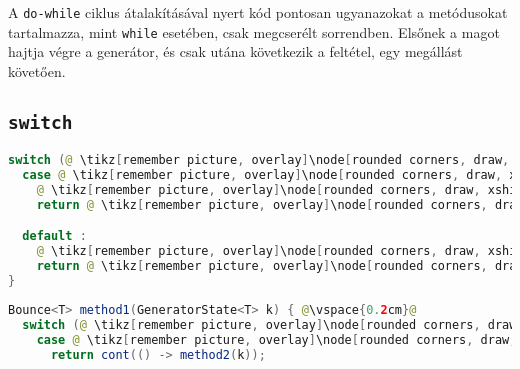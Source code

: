 A \texttt{do-while} ciklus átalakításával nyert kód pontosan ugyanazokat a metódusokat tartalmazza, mint \texttt{while} esetében, csak megcserélt sorrendben. Elsőnek a magot hajtja végre a generátor, és csak utána következik a feltétel, egy megállást követően.

\subsection{\texttt{switch}}

\begin{center}
\begin{mdframed}[topline=true]
\begin{minipage}[t]{0.4\textwidth}
\begin{lstlisting}[language=Java, numbers=none, breaklines=true]
switch (@ \tikz[remember picture, overlay]\node[rounded corners, draw, xshift=-0.1cm, inner sep=5pt, anchor=west, yshift=0.1cm] {Szelektor}; \vspace*{0.3cm} \hspace*{1.35cm}@) {
  case @ \tikz[remember picture, overlay]\node[rounded corners, draw, xshift=-0.1cm, inner sep=5pt, anchor=west, yshift=0.1cm] {Konstans}; \vspace*{0.3cm} \hspace*{1.35cm}@:
    @ \tikz[remember picture, overlay]\node[rounded corners, draw, xshift=-0.1cm, inner sep=5pt, anchor=west] {Kódrészlet \#1}; \vspace*{0.5cm} @ 
    return @ \tikz[remember picture, overlay]\node[rounded corners, draw, xshift=-0.1cm, inner sep=5pt, anchor=west, yshift=0.1cm] {Kifejezés \#1}; \vspace*{0.3cm} @

  default :
    @ \tikz[remember picture, overlay]\node[rounded corners, draw, xshift=-0.1cm, inner sep=5pt, anchor=west] {Kódrészlet \#2}; \vspace*{0.5cm} @ 
    return @ \tikz[remember picture, overlay]\node[rounded corners, draw, xshift=-0.1cm, inner sep=5pt, anchor=west, yshift=0.1cm] {Kifejezés \#2}; \vspace*{0.3cm} @
}
\end{lstlisting}
\end{minipage} 
\begin{minipage}[t]{0.6\textwidth}
\begin{lstlisting}[language=Java, numbers=none, breaklines=true]
Bounce<T> method1(GeneratorState<T> k) { @\vspace{0.2cm}@
  switch (@ \tikz[remember picture, overlay]\node[rounded corners, draw, xshift=-0.1cm, inner sep=5pt, anchor=west, yshift=0.1cm] {Szelektor}; \vspace*{0.3cm} \hspace*{1.35cm}@) {
    case @ \tikz[remember picture, overlay]\node[rounded corners, draw, xshift=-0.1cm, inner sep=5pt, anchor=west, yshift=0.1cm] {Konstans}; \vspace*{0.1cm} \hspace*{1.35cm}@:
      return cont(() -> method2(k));


\end{lstlisting}
\end{minipage}
\end{mdframed}
\end{center}

